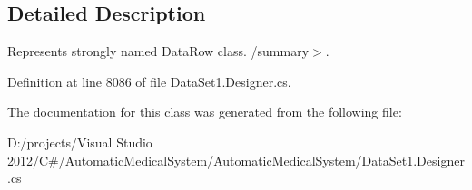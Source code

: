 \subsection{Detailed Description}
Represents strongly named DataRow class. /summary$>$. 

Definition at line 8086 of file DataSet1.Designer.cs.

The documentation for this class was generated from the following file:\begin{CompactItemize}
\item 
D:/projects/Visual Studio 2012/C\#/AutomaticMedicalSystem/AutomaticMedicalSystem/DataSet1.Designer.cs\end{CompactItemize}
